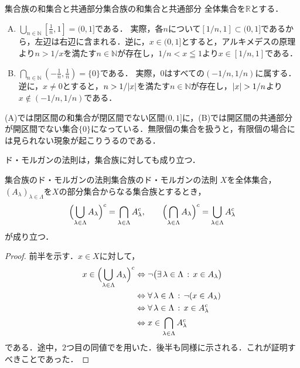 \begin{example}{集合族の和集合と共通部分}{集合族の和集合と共通部分}
  全体集合を$\mathbb{R}$とする．
  \begin{enumerate}[(A)]
    \item $\displaystyle \bigcup_{n \in \mathbb{N}} \left[ \frac{1}{n}, 1 \right] = (0, 1]$である．
          実際，各$n$について$[1/n, 1] \subset (0, 1]$であるから，左辺は右辺に含まれる．逆に，$x \in (0, 1]$とすると，アルキメデスの原理より$n > 1/x$を満たす$n \in \mathbb{N}$が存在し，$1/n < x \leqq 1$より$x \in [1/n, 1]$である．
    \item $\displaystyle \bigcap_{n \in \mathbb{N}} \left( -\frac{1}{n}, \frac{1}{n} \right) = \{0\}$である．
          実際，$0$はすべての$(-1/n, 1/n)$に属する．逆に，$x \ne 0$とすると，$n > 1/\lvert x\rvert$を満たす$n \in \mathbb{N}$が存在し，$\lvert x\rvert > 1/n$より$x \notin (-1/n, 1/n)$である．
  \end{enumerate}
  (A)では閉区間の和集合が閉区間でない区間$(0, 1]$に，(B)では開区間の共通部分が開区間でない集合$\{0\}$になっている．無限個の集合を扱うと，有限個の場合には見られない現象が起こりうるのである．
\end{example}

ド・モルガンの法則は，集合族に対しても成り立つ．

\begin{prop}{集合族のド・モルガンの法則}{集合族のド・モルガンの法則}
  $X$を全体集合，$(A_\lambda)_{\lambda \in \Lambda}$を$X$の部分集合からなる集合族とするとき，
  \[
    \Bigl( \bigcup_{\lambda \in \Lambda} A_\lambda \Bigr)^c = \bigcap_{\lambda \in \Lambda} A_\lambda^c,
    \qquad
    \Bigl( \bigcap_{\lambda \in \Lambda} A_\lambda \Bigr)^c = \bigcup_{\lambda \in \Lambda} A_\lambda^c
  \]
  が成り立つ．
\end{prop}

\begin{tleftbar}
  \begin{proof}
    前半を示す．$x \in X$に対して，
    \begin{align*}
      x \in \Bigl( \bigcup_{\lambda \in \Lambda} A_\lambda \Bigr)^c
      & \mathrel{\Leftrightarrow} \lnot \bigl( \exists\, \lambda \in \Lambda \,:\, x \in A_\lambda \bigr) \\
      & \mathrel{\Leftrightarrow} \forall\, \lambda \in \Lambda \,:\, \lnot ( x \in A_\lambda ) \\
      & \mathrel{\Leftrightarrow} \forall\, \lambda \in \Lambda \,:\, x \in A_\lambda^c \\
      & \mathrel{\Leftrightarrow} x \in \bigcap_{\lambda \in \Lambda} A_\lambda^c
    \end{align*}
    である．途中，$2$つ目の同値でを用いた．後半も同様に示される．これが証明すべきことであった．
  \end{proof}
\end{tleftbar}


